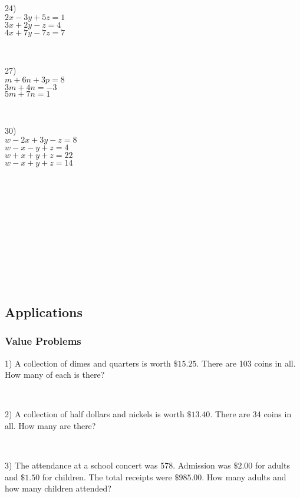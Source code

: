 \begin{multicols}{3}
	24)\\
  $2 x - 3 y + 5 z = 1$\\
  $3 x + 2 y - z = 4$\\
  $4 x + 7 y - 7 z = 7$\par
~\par
  27)\\
  $m + 6 n + 3 p = 8$\\
  $3 m + 4 n = - 3$\\
  $5 m + 7 n = 1$\par
~\par
  30)\\
  $w - 2 x + 3 y - z = 8$\\
	$w - x - y + z = 4$\\
	$w + x + y + z = 22$\\
	$w - x + y + z = 14$\par
~\par
~\par
~\par
~\par
~\par
~\par
	
\end{multicols}

\pagebreak

\subsection{Applications}\par

	\subsubsection{Value Problems}\par

{}

1) A collection of dimes and quarters is worth $\$15.25$. There are
103 coins in all.  How many of each is there?\par
~\par
2) A collection of half dollars and nickels is worth $\$13.40$. There
are 34 coins in  all. How many are there?\par
~\par

3) The attendance at a school concert was 578. Admission was $\$2.00$
for adults  and $\$1.50$ for children. The total
receipts were $\$985.00$. How many adults and  how many
children attended?\par
~\par

